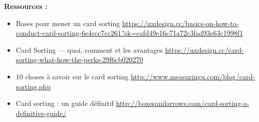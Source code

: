 \textbf{Ressources :}

\begin{itemize}
\item Bases pour mener un card sorting \url{https://uxdesign.cc/basics-on-how-to-conduct-card-sorting-6e4ccc7cc261?sk=cafd49e16c71a72c3fad93e63c1998f1}
\item Card Sorting  ---  quoi, comment et les avantages \url{https://uxdesign.cc/card-sorting-what-how-the-perks-29f6cb020270}
\item 10 choses à savoir sur le card sorting \url{http://www.measuringu.com/blog/card-sorting.php}
\item Card sorting : un guide définitif \url{http://boxesandarrows.com/card-sorting-a-definitive-guide/}
\end{itemize}

